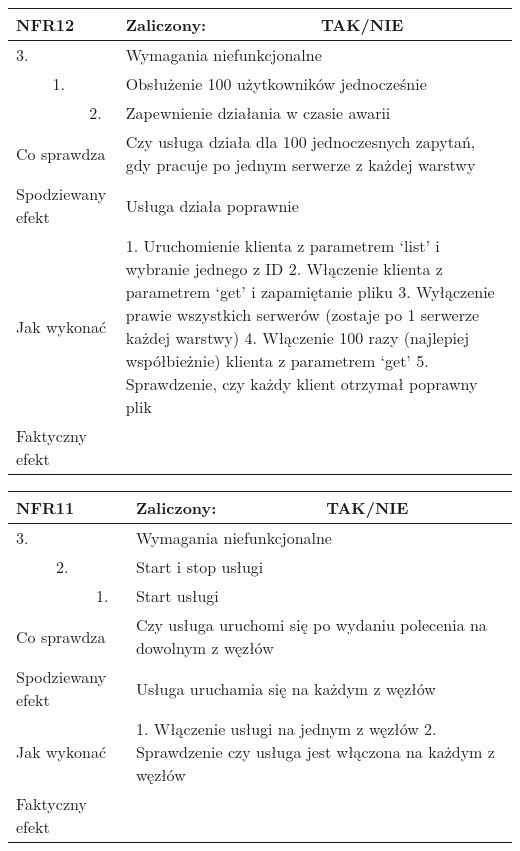 \begin{tabular}{|p{20pt}|p{20pt}|p{20pt}|p{250pt}|p{60pt}|}
	\hline
	\multicolumn{3}{|p{70pt}|}{NFR12} & Zaliczony: & TAK/NIE \\ \hline
	3. & & & \multicolumn{2}{|p{310pt}|}{Wymagania niefunkcjonalne } \\ \hline
	& 1. & & \multicolumn{2}{|p{310pt}|}{Obsłużenie 100 użytkowników jednocześnie } \\ \hline
	& & 2. & \multicolumn{2}{|p{310pt}|}{Zapewnienie działania w czasie awarii } \\ \hline
	\multicolumn{3}{|p{70pt}|}{Co sprawdza} & \multicolumn{2}{|p{310pt}|}{Czy usługa działa dla 100 jednoczesnych zapytań, gdy pracuje po jednym serwerze z każdej warstwy} \\ \hline
	\multicolumn{3}{|p{70pt}|}{Spodziewany efekt} & \multicolumn{2}{|p{310pt}|}{Usługa działa poprawnie} \\ \hline
	\multicolumn{3}{|p{70pt}|}{Jak wykonać} & \multicolumn{2}{|p{310pt}|}{1. Uruchomienie klienta z parametrem ‘list’ i wybranie jednego z ID
2. Włączenie klienta z parametrem ‘get’ i zapamiętanie pliku
3. Wyłączenie prawie wszystkich serwerów (zostaje po 1 serwerze każdej warstwy)
4. Włączenie 100 razy (najlepiej współbieżnie) klienta z parametrem ‘get’
5. Sprawdzenie, czy każdy klient otrzymał poprawny plik} \\ \hline
	\multicolumn{3}{|p{70pt}|}{Faktyczny efekt} & \multicolumn{2}{|p{310pt}|}{} \\ \hline
\end{tabular}

\begin{tabular}{|p{20pt}|p{20pt}|p{20pt}|p{250pt}|p{60pt}|}
	\hline
	\multicolumn{3}{|p{70pt}|}{NFR11} & Zaliczony: & TAK/NIE \\ \hline
	3. & & & \multicolumn{2}{|p{310pt}|}{Wymagania niefunkcjonalne } \\ \hline
	& 2. & & \multicolumn{2}{|p{310pt}|}{Start i stop usługi } \\ \hline
	& & 1. & \multicolumn{2}{|p{310pt}|}{Start usługi } \\ \hline
	\multicolumn{3}{|p{70pt}|}{Co sprawdza} & \multicolumn{2}{|p{310pt}|}{Czy usługa uruchomi się po wydaniu polecenia na dowolnym z węzłów} \\ \hline
	\multicolumn{3}{|p{70pt}|}{Spodziewany efekt} & \multicolumn{2}{|p{310pt}|}{Usługa uruchamia się na każdym z węzłów} \\ \hline
	\multicolumn{3}{|p{70pt}|}{Jak wykonać} & \multicolumn{2}{|p{310pt}|}{1. Włączenie usługi na jednym z węzłów
2. Sprawdzenie czy usługa jest włączona na każdym z węzłów} \\ \hline
	\multicolumn{3}{|p{70pt}|}{Faktyczny efekt} & \multicolumn{2}{|p{310pt}|}{} \\ \hline
\end{tabular}

